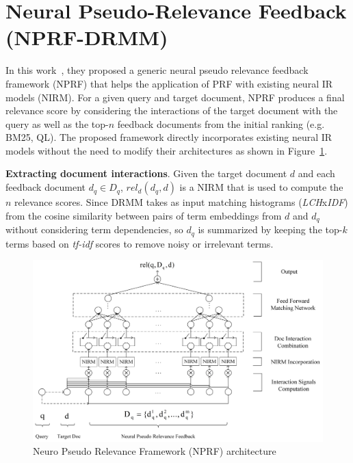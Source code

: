 \section{Neural Pseudo-Relevance Feedback (NPRF-DRMM)}
\label{sec:nprf_drmm_reproducibility_desc}
In this work~\citep{li2018nprf}, they proposed a generic neural pseudo relevance feedback framework (NPRF) that helps the application of PRF with existing neural IR models (NIRM). For a given query and target document, NPRF produces a final relevance score by considering the interactions of the target document with the query as well as the top-$n$ feedback documents from the initial ranking (e.g. BM25, QL). The proposed framework directly incorporates existing neural IR models without the need to modify their architectures as shown in Figure~\ref{fig:nprf_drmm_pipeline}.


\textbf{Extracting document interactions}. Given the target document $d$ and each feedback document $d_q\in D_q$, $rel_d(d_q, d)$ is a NIRM that is used to compute the $n$ relevance scores. Since DRMM takes as input matching histograms (\textit{LCH}x\textit{IDF}) from the cosine similarity between pairs of term embeddings from $d$ and $d_q$ without considering term dependencies, so $d_q$ is summarized by keeping the top-$k$ terms based on \textit{tf-idf} scores to remove noisy or irrelevant terms.

\begin{figure}
    \centering
    \includegraphics[width=14cm]{Figures/NPRF-arch.jpg}
    \caption{Neuro Pseudo Relevance Framework (NPRF) architecture~\citep{li2018nprf}}
    \label{fig:nprf_drmm_pipeline}
\end{figure}

